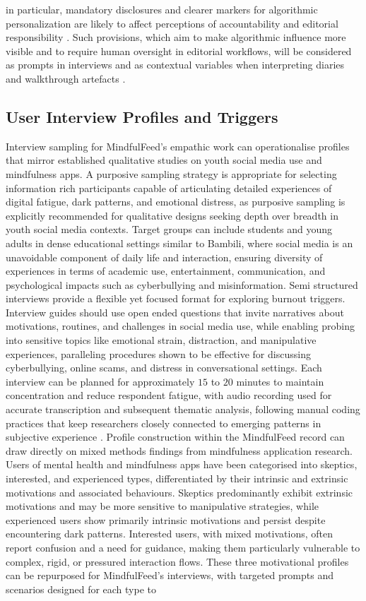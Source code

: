 \documentclass{article}
\begin{document}
in particular, mandatory disclosures and clearer markers for algorithmic personalization are likely to affect perceptions of accountability and editorial responsibility \parencites[9]{0235650}. Such provisions, which aim to make algorithmic influence more visible and to require human oversight in editorial workflows, will be considered as prompts in interviews and as contextual variables when interpreting diaries and walkthrough artefacts \parencites[9]{0235650}.

\subsection{User Interview Profiles and Triggers}
\label{sec:user_interview_profiles_triggers} Interview sampling for MindfulFeed's empathic work can operationalise profiles that mirror established qualitative studies on youth social media use and mindfulness apps. A purposive sampling strategy is appropriate for selecting information rich participants capable of articulating detailed experiences of digital fatigue, dark patterns, and emotional distress, as purposive sampling is explicitly recommended for qualitative designs seeking depth over breadth in youth social media contexts. Target groups can include students and young adults in dense educational settings similar to Bambili, where social media is an unavoidable component of daily life and interaction, ensuring diversity of experiences in terms of academic use, entertainment, communication, and psychological impacts such as cyberbullying and misinformation. Semi structured interviews provide a flexible yet focused format for exploring burnout triggers. Interview guides should use open ended questions that invite narratives about motivations, routines, and challenges in social media use, while enabling probing into sensitive topics like emotional strain, distraction, and manipulative experiences, paralleling procedures shown to be effective for discussing cyberbullying, online scams, and distress in conversational settings. Each interview can be planned for approximately $15$ to $20$ minutes to maintain concentration and reduce respondent fatigue, with audio recording used for accurate transcription and subsequent thematic analysis, following manual coding practices that keep researchers closely connected to emerging patterns in subjective experience \parencites[5]{1161579}. Profile construction within the MindfulFeed record can draw directly on mixed methods findings from mindfulness application research. Users of mental health and mindfulness apps have been categorised into skeptics, interested, and experienced types, differentiated by their intrinsic and extrinsic motivations and associated behaviours. Skeptics predominantly exhibit extrinsic motivations and may be more sensitive to manipulative strategies, while experienced users show primarily intrinsic motivations and persist despite encountering dark patterns. Interested users, with mixed motivations, often report confusion and a need for guidance, making them particularly vulnerable to complex, rigid, or pressured interaction flows. These three motivational profiles can be repurposed for MindfulFeed's interviews, with targeted prompts and scenarios designed for each type to 
\end{document}
